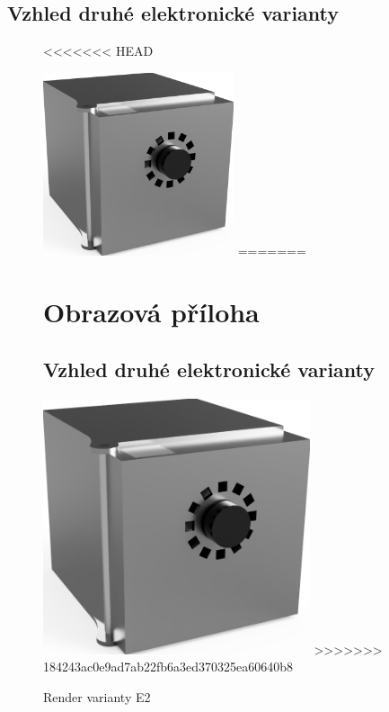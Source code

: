 \newcommand\OdsazeniNadpisu{10mm}
\section{Vzhled druhé elektronické varianty} 
\begin{figure}
<<<<<<< HEAD
	
    \centering
    \includegraphics[width=0.5\textwidth]{kapitoly/obrazky/E2/predni_render.png}
=======
    \appendix
    \chapter{Obrazová příloha}
	\section{Vzhled druhé elektronické varianty}
	\vspace{\OdsazeniNadpisu}
    \centering
    \includegraphics[width=0.7\textwidth]{kapitoly/obrazky/E2/predni_render.png}
>>>>>>> 184243ac0e9ad7ab22fb6a3ed370325ea60640b8
    \caption{Render varianty E2}
    \label{fig:E2-render}
\end{figure}

